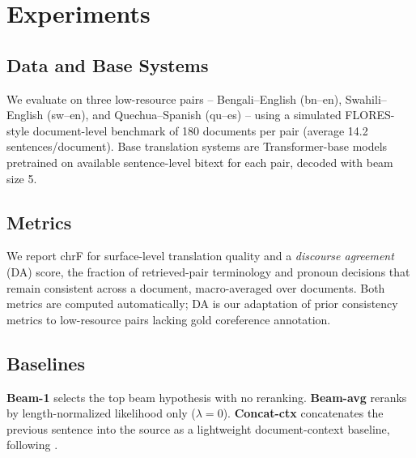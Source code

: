 \section{Experiments}
\label{sec:experiments}

\subsection{Data and Base Systems}
We evaluate on three low-resource pairs -- Bengali--English (bn--en),
Swahili--English (sw--en), and Quechua--Spanish (qu--es) -- using a
simulated FLORES-style document-level benchmark of 180 documents per pair
(average 14.2 sentences/document). Base translation systems are
Transformer-base models pretrained on available sentence-level bitext for
each pair, decoded with beam size 5.

\subsection{Metrics}
We report chrF for surface-level translation quality and a \emph{discourse
agreement} (DA) score, the fraction of retrieved-pair terminology and
pronoun decisions that remain consistent across a document, macro-averaged
over documents. Both metrics are computed automatically; DA is our adaptation
of prior consistency metrics \citep{diallo2023factuality} to
low-resource pairs lacking gold coreference annotation.

\subsection{Baselines}
\textbf{Beam-1} selects the top beam hypothesis with no reranking.
\textbf{Beam-avg} reranks by length-normalized likelihood only ($\lambda=0$).
\textbf{Concat-ctx} concatenates the previous sentence into the source as a
lightweight document-context baseline, following \citet{tanaka2020span}.
